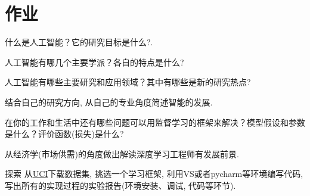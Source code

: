 \section{作业}
\begin{think}
什么是人工智能？它的研究目标是什么?.
\end{think}
\begin{think}
人工智能有哪几个主要学派？各自的特点是什么?
\end{think}
\begin{think}
人工智能有哪些主要研究和应用领域？其中有哪些是新的研究热点?
\end{think}
\begin{think}
  结合自己的研究方向, 从自己的专业角度简述智能的发展.
\end{think}
\begin{think}
在你的工作和生活中还有哪些问题可以用监督学习的框架来解决？模型假设和参数是什么？评价函数(损失)是什么?
\end{think}
\begin{think}
  从经济学(市场供需)的角度做出解读深度学习工程师有发展前景.
\end{think}
\begin{custom}[explorecolor]{探索}
  从\href{http://archive.ics.uci.edu/ml/datasets.php}{UCI}下载数据集, 挑选一个学习框架, 利用VS或者pycharm等环境编写代码, 写出所有的实现过程的实验报告(环境安装、调试, 代码等环节).
\end{custom}

